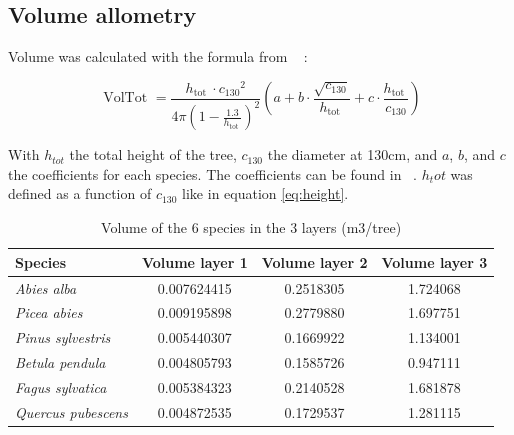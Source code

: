 \documentclass{article}
\begin{document}
\subsection{Volume allometry}

Volume was calculated with the formula from ~\autocite{deleuzeEstimerVolumeTotal2014} :

\begin{equation}
    \text { VolTot }=\frac{h_{\text {tot }} \cdot c_{130}{ }^2}{4 \pi\left(1-\frac{1.3}{h_{\text {tot }}}\right)^2}\left(a+b \cdot \frac{\sqrt{c_{130}}}{h_{\text {tot }}}+c \cdot \frac{h_{\text {tot }}}{c_{130}}\right)
\end{equation}

With $h_{tot}$ the total height of the tree, $c_{130}$ the diameter at 130cm, and $a$, $b$, and $c$ the coefficients for each species. The coefficients can be found in ~\autocite{deleuzeEstimerVolumeTotal2014}. $h_tot$ was defined as a function of $c_{130}$ like in equation \ref{eq:height}. 

\begin{table}[h]
    \centering
    \begin{tabular}{lccc}
    \hline
    \hline
    \textbf{Species} & \textbf{Volume layer 1} & \textbf{Volume layer 2} & \textbf{Volume layer 3} \\
    \hline
    \textit{Abies alba} & 0.007624415 & 0.2518305 & 1.724068 \\
    \textit{Picea abies} & 0.009195898 & 0.2779880 & 1.697751 \\
    \textit{Pinus sylvestris} & 0.005440307 & 0.1669922 & 1.134001 \\
    \textit{Betula pendula} & 0.004805793 & 0.1585726 & 0.947111 \\
    \textit{Fagus sylvatica} & 0.005384323 & 0.2140528 & 1.681878 \\
    \textit{Quercus pubescens} & 0.004872535 & 0.1729537 & 1.281115 \\
    \hline
    \hline
    \end{tabular}
    \caption{Volume of the 6 species in the 3 layers (m3/tree)}
    \label{tab:volume}
\end{table}
\end{document}
